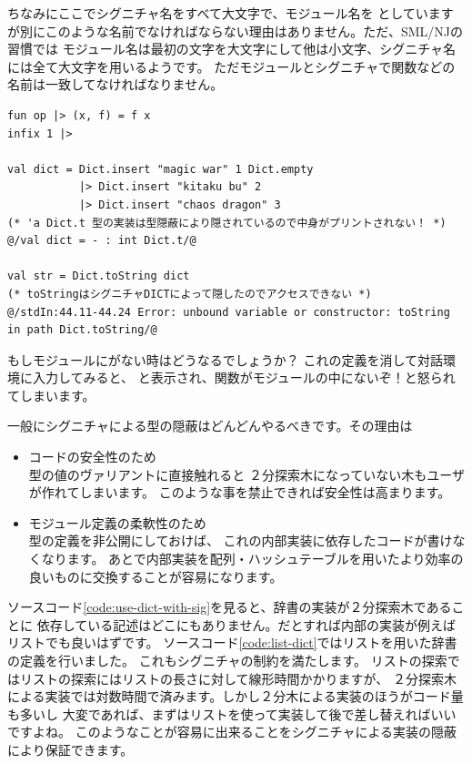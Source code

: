 \documentclass[11pt,a4paper]{jarticle}
\begin{document}
ちなみにここでシグニチャ名をすべて大文字で、モジュール名を
としていますが別にこのような名前でなければならない理由はありません。ただ、SML/NJの習慣では
モジュール名は最初の文字を大文字にして他は小文字、シグニチャ名には全て大文字を用いるようです。
ただモジュールとシグニチャで関数などの名前は一致してなければなりません。

\begin{lstlisting}[caption=\sml{Dict}を使おう,label=code:use-dict-with-sig]
fun op |> (x, f) = f x
infix 1 |>

val dict = Dict.insert "magic war" 1 Dict.empty
           |> Dict.insert "kitaku bu" 2
           |> Dict.insert "chaos dragon" 3
(* 'a Dict.t 型の実装は型隠蔽により隠されているので中身がプリントされない！ *)
@/val dict = - : int Dict.t/@

val str = Dict.toString dict
(* toStringはシグニチャDICTによって隠したのでアクセスできない *)
@/stdIn:44.11-44.24 Error: unbound variable or constructor: toString in path Dict.toString/@
\end{lstlisting}

もしモジュールにがない時はどうなるでしょうか？
これの定義を消して対話環境に入力してみると、
と表示され、関数がモジュールの中にないぞ！と怒られてしまいます。

一般にシグニチャによる型の隠蔽はどんどんやるべきです。その理由は
\begin{itemize}
\item コードの安全性のため\\
  型の値のヴァリアントに直接触れると
  ２分探索木になっていない木もユーザが作れてしまいます。
  このような事を禁止できれば安全性は高まります。
\item モジュール定義の柔軟性のため\\
  型の定義を非公開にしておけば、
これの内部実装に依存したコードが書けなくなります。
あとで内部実装を配列・ハッシュテーブルを用いたより効率の良いものに交換することが容易になります。
\end{itemize}

ソースコード\ref{code:use-dict-with-sig}を見ると、辞書の実装が２分探索木であることに
依存している記述はどこにもありません。だとすれば内部の実装が例えばリストでも良いはずです。
ソースコード\ref{code:list-dict}ではリストを用いた辞書の定義を行いました。
これもシグニチャの制約を満たします。
リストの探索ではリストの探索にはリストの長さに対して線形時間かかりますが、
２分探索木による実装では対数時間で済みます。しかし２分木による実装のほうがコード量も多いし
大変であれば、まずはリストを使って実装して後で差し替えればいいですよね。
このようなことが容易に出来ることをシグニチャによる実装の隠蔽により保証できます。
\end{document}
